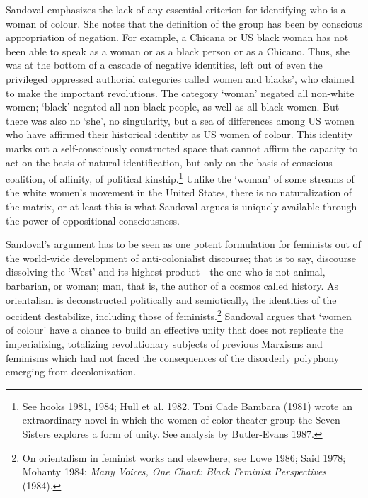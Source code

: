 \documentclass[DIV=12,%
               BCOR=10mm,%
               headinclude=false,%
               footinclude=false,open=any,%
               fontsize=11pt,%
               twoside,%
               paper=210mm:11in]%
               {scrbook}
\begin{document}
Sandoval emphasizes the lack of any essential criterion for identifying who is a woman of colour. She notes that the definition of the group has been by conscious appropriation of negation. For example, a Chicana or US black woman has not been able to speak as a woman or as a black person or as a Chicano. Thus, she was at the bottom of a cascade of negative identities, left out of even the privileged oppressed authorial categories called women and blacks’, who claimed to make the important revolutions. The category ‘woman’ negated all non-white women; ‘black’ negated all non-black people, as well as all black women. But there was also no ‘she’, no singularity, but a sea of differences among US women who have affirmed their historical identity as US women of colour. This identity marks out a self-consciously constructed space that cannot affirm the capacity to act on the basis of natural identification, but only on the basis of conscious coalition, of affinity, of political kinship.\footnote{See hooks 1981, 1984; Hull et al. 1982. Toni Cade Bambara (1981) wrote an extraordinary novel in which the women of color theater group the Seven Sisters explores a form of unity. See analysis by Butler-Evans 1987.} Unlike the ‘woman’ of some streams of the white women’s movement in the United States, there is no naturalization of the matrix, or at least this is what Sandoval argues is uniquely available through the power of oppositional consciousness.


Sandoval’s argument has to be seen as one potent formulation for feminists out of the world-wide development of anti-colonialist discourse; that is to say, discourse dissolving the ‘West’ and its highest product—the one who is not animal, barbarian, or woman; man, that is, the author of a cosmos called history. As orientalism is deconstructed politically and semiotically, the identities of the occident destabilize, including those of feminists.\footnote{On orientalism in feminist works and elsewhere, see Lowe 1986; Said 1978; Mohanty 1984; \emph{Many Voices, One Chant: Black Feminist Perspectives} (1984).} Sandoval argues that ‘women of colour’ have a chance to build an effective unity that does not replicate the imperializing, totalizing revolutionary subjects of previous Marxisms and feminisms which had not faced the consequences of the disorderly polyphony emerging from decolonization.
\end{document}
